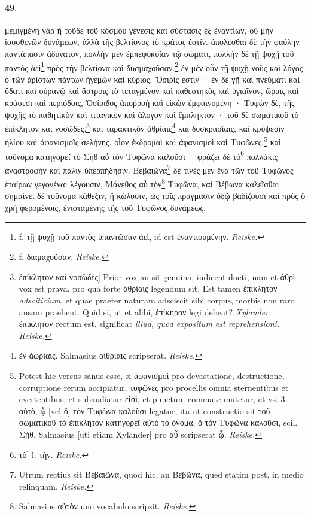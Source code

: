 \documentclass[a4paper, 11pt, oneside, polutonikogreek, german]{article}
\begin{document}
\paragraph{49.}
μεμιγμένη γὰρ ἡ τοῦδε τοῦ κόσμου γένεσις καὶ σύστασις ἐξ ἐναντίων, οὐ μὴν ἰσοσθενῶν δυνάμεων, ἀλλὰ τῆς βελτίονος τὸ κράτος ἐστίν. ἀπολέσθαι δὲ τὴν φαύλην παντάπασιν ἀδύνατον, πολλὴν μὲν ἐμπεφυκυῖαν τῷ σώματι, πολλὴν δὲ τῇ ψυχῇ τοῦ παντὸς ἀεὶ\footnote{f. τῇ ψυχῇ τοῦ παντὸς ὑπαντῶσαν ἀεὶ, id est ἐναντιουμένην. \emph{Reiske.}} πρὸς τὴν βελτίονα καὶ δυσμαχοῦσαν.\footnote{f. διαμαχοῦσαν. \emph{Reiske.}} ἐν μὲν οὖν τῇ ψυχῇ νοῦς καὶ λόγος ὁ τῶν ἀρίστων πάντων ἡγεμὼν καὶ κύριος, Ὄσιρίς ἐστιν · ἐν δὲ γῇ καὶ πνεύματι καὶ ὕδατι καὶ οὐρανῷ καὶ ἄστροις τὸ τεταγμένον καὶ καθεστηκὸς καὶ ὑγιαῖνον, ὥραις καὶ κράσεσι καὶ περιόδοις, Ὀσίριδος ἀποῤῥοὴ καὶ εἰκὼν ἐμφαινομένη · Τυφὼν δὲ, τῆς ψυχῆς τὸ παθητικὸν καὶ τιτανικὸν καὶ ἄλογον καὶ ἔμπληκτον · τοῦ δὲ σωματικοῦ τὸ ἐπίκλητον καὶ νοσῶδες,\footnote{ἐπίκλητον καὶ νοσῶδες] Prior vox an sit genuina, iudicent docti, nam et ἀθρὶ vox est prava. pro qua forte ἀθρίαις legendum sit. Est tamen ἐπίκλητον \emph{adsciticium}, et quae praeter naturam adsciscit sibi corpus, morbis non raro ansam praebent. Quid si, ut et alibi, ἐπίκηρον legi debeat? \emph{Xylander.} ἐπίκλητον rectum est. significat \emph{illud, quod expositum est reprehensioni.} \emph{Reiske.}} καὶ ταρακτικὸν ἀθρίαις\footnote{ἐν ἀωρίαις. Salmasius αἰθρίαις scripserat. \emph{Reiske.} } καὶ δυσκρασίαις, καὶ κρύψεσιν ἡλίου καὶ ἀφανισμοῖς σελήνης, οἷον ἐκδρομαὶ καὶ ἀφανισμοὶ καὶ Τυφῶνες.\footnote{Potest hic versus sanus esse, si ἀφανισμοὶ pro devastatione, destructione, corruptione rerum accipiatur, τυφῶνες pro procellis omnia sternentibus et evertentibus, et subaudiatur εἰσὶ, et punctum commate mutetur, et vs. 3. αὐτὸ, ᾧ [vel ὃ] τὸν Τυφῶνα καλοῦσι legatur, ita ut constructio sit τοῦ σωματικοῦ τὸ ἐπικλητον κατηγορεῖ αὐτὸ τὸ ὂνομα, ὃ τὸν Τυφῶνα καλοῦσι, scil. Σήθ. Salmasius [uti etiam Xylander] pro αὖ scripserat ᾧ. \emph{Reiske.}} καὶ τοὔνομα κατηγορεῖ τὸ Σὴθ αὖ τὸν Τυφῶνα καλοῦσι · φράζει δὲ τὸ\footnote{τὸ] l. τὴν. \emph{Reiske.}} πολλάκις ἀναστροφὴν καὶ πάλιν ὑπερπήδησιν. Βεβαιῶνα\footnote{Utrum rectius sit Βεβαιῶνα, quod hic, an Βεβῶνα, qued statim post, in medio relinquam. \emph{Reiske.}} δὲ τινὲς μὲν ἕνα τῶν τοῦ Τυφῶνος ἑταίρων γεγονέναι λέγουσιν, Μάνεθος αὖ τὸν\footnote{Salmasius αὐτὸν uno vocabulo scripsit. \emph{Reiske.}} Τυφῶνα, καὶ Βέβωνα καλεῖσθαι. σημαίνει δὲ τοὔνομα κάθεξιν, ἢ κώλυσιν, ὡς τοῖς πράγμασιν ὁδῷ βαδίζουσι καὶ πρὸς ὃ χρὴ φερομένοις, ἐνισταμένης τῆς τοῦ Τυφῶνος δυνάμεως.
\end{document}
